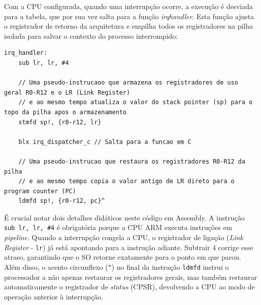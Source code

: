Com a CPU configurada, quando uma interrupção ocorre, a execução é desviada para a tabela, que por sua vez salta para a função \emph{irq\textunderscore{}handler}. Esta função ajusta o registrador de retorno da arquitetura e empilha todos os registradores na pilha isolada para salvar o contexto do processo interrompido:

\begin{lstlisting}[language=arm]
irq_handler:
    sub lr, lr, #4
    
    // Uma pseudo-instrucaoo que armazena os registradores de uso geral R0-R12 e o LR (Link Register)
    // e ao mesmo tempo atualiza o valor do stack pointer (sp) para o topo da pilha apos o armazenamento
    stmfd sp!, {r0-r12, lr}
    
    blx irq_dispatcher_c // Salta para a funcao em C
    
    // Uma pseudo-instrucao que restaura os registradores R0-R12 da pilha
    // e ao mesmo tempo copia o valor antigo de LR direto para o program counter (PC)
    ldmfd sp!, {r0-r12, pc}^
\end{lstlisting}

É crucial notar dois detalhes didáticos neste código em Assembly. A instrução \texttt{sub lr, lr, \#4} é obrigatória porque a CPU ARM executa instruções em \emph{pipeline}. Quando a interrupção congela a CPU, o registrador de ligação (\emph{Link Register} - \texttt{lr}) já está apontando para a instrução adiante. Subtrair 4 corrige esse atraso, garantindo que o SO retorne exatamente para o ponto em que parou. Além disso, o acento circunflexo (\texttt{\^}) no final da instrução \texttt{ldmfd} instrui o processador a não apenas restaurar os registradores gerais, mas também restaurar automaticamente o registrador de \emph{status} (CPSR), devolvendo a CPU ao modo de operação anterior à interrupção.

